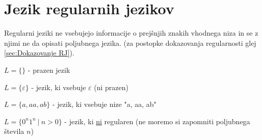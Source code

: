 \documentclass[10pt,a4paper,oneside]{book}
\begin{document}
\section{Jezik regularnih jezikov}
Regularni jeziki ne vsebujejo informacije o prejšnjih znakih vhodnega niza in se z njimi ne da opisati poljubnega jezika. (za postopke dokazovanja regularnosti glej \ref{sec:Dokazovanje RJ}).
\begin{primeri}
	\item $L =\{ \}$ - prazen jezik
	\item $L = \{ \varepsilon \}$ - jezik, ki vsebuje $\varepsilon$ (ni prazen)
	\item $L = \{ a, aa, ab \}$ - jezik, ki vsebuje nize "a, aa, ab"
	\item $L = \{ 0^n 1^n \ | \ n > 0 \} $ - jezik, ki \underline{ni} regularen (ne moremo si zapomniti poljubnega števila $n$)
\end{primeri}
\end{document}
